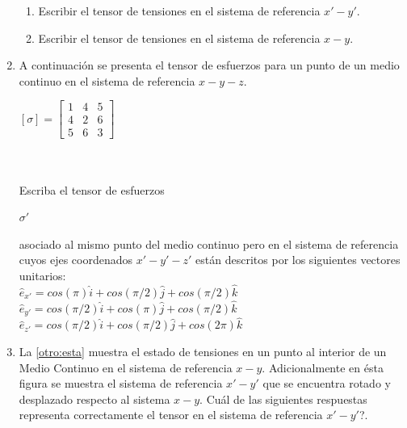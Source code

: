 \documentclass[../notas medios.tex]{subfiles}
\begin{document}
\begin{enumerate}
\begin{enumerate}
	\item Escribir el tensor de tensiones en el sistema de referencia $x'-y'$.
	\item Escribir el tensor de tensiones en el sistema de referencia $x-y$.
\end{enumerate}
\item \label{punto14} A continuaci\'on se presenta el tensor de esfuerzos para
un punto de un medio continuo en el sistema de referencia $x-y-z$.\\
\begin{large}
	$[\sigma] = \left[ \begin{array}{ccc}
	1 & 4 & 5 \\ 
	4 & 2 & 6 \\
	5 & 6 & 3
	\end{array}  \right] $ \\\\\\
\end{large}
%
Escriba el tensor de esfuerzos \begin{large} $\sigma'$ \end{large} asociado al
mismo punto del medio continuo pero en el sistema de referencia cuyos ejes
coordenados $x'-y'-z'$ est\'an descritos por los siguientes vectores unitarios:
\\
	$\hat{e}_{x'}= cos (\pi) \hat{i} + cos (\pi /2) \hat{j} + cos (\pi /2) \hat{k}$\\
	$\hat{e}_{y'}= cos (\pi /2) \hat{i} + cos (\pi) \hat{j} + cos (\pi /2) \hat{k}$\\
	$\hat{e}_{z'}= cos (\pi /2) \hat{i} + cos (\pi /2) \hat{j} + cos (2 \pi) \hat{k}$
\item \label{punto15} La \cref{otro:esta} muestra el estado de tensiones
en un punto al interior de un Medio Continuo en el sistema de referencia $x-y$. Adicionalmente en \'esta figura se muestra el sistema de referencia $x'-y'$ que se encuentra rotado y desplazado respecto al sistema $x-y$. \textquestiondown Cu\'al de las siguientes respuestas representa correctamente el tensor en el sistema de referencia $x'-y'$?.
%
	\begin{enumerate}
		\item $[\sigma] = \left[ \begin{array}{ccc}
			a & b \\ 
			b & -c
			\end{array}  \right] $
		\item $[\sigma] = \left[ \begin{array}{ccc}

\end{array}
\end{enumerate}
\end{enumerate}
\end{document}
